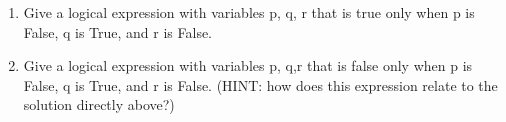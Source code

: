 \begin{enumerate}[i]

    \item

    Give a logical expression with variables p, q, r that is true only when p is False, q is True, and r is False.


    \item

    Give a logical expression with variables p, q,r that is false only when p is False, q is True, and r is False.
    (HINT: how does this expression relate to the solution directly above?)


\end{enumerate}